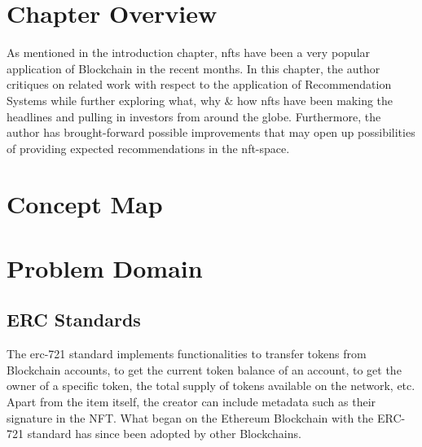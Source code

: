 


\section{Chapter Overview}
As mentioned in the introduction chapter, \gls{nft}s have been a very popular application of Blockchain in the recent months. In this chapter, the author critiques on related work with respect to the application of Recommendation Systems while further exploring what, why \& how \gls{nft}s have been making the headlines and pulling in investors from around the globe. Furthermore, the author has brought-forward possible improvements that may open up possibilities of providing expected recommendations in the \gls{nft}-space.

\section{Concept Map}




\section{Problem Domain}


\subsection{ERC Standards}

The \gls{erc}-721 standard implements functionalities to transfer tokens from Blockchain accounts, to get the current token balance of an account, to get the owner of a specific token, the total supply of tokens available on the network, etc. Apart from the item itself, the creator can include metadata such as their signature in the NFT. What began on the Ethereum Blockchain with the ERC-721 standard has since been adopted by other Blockchains. 


